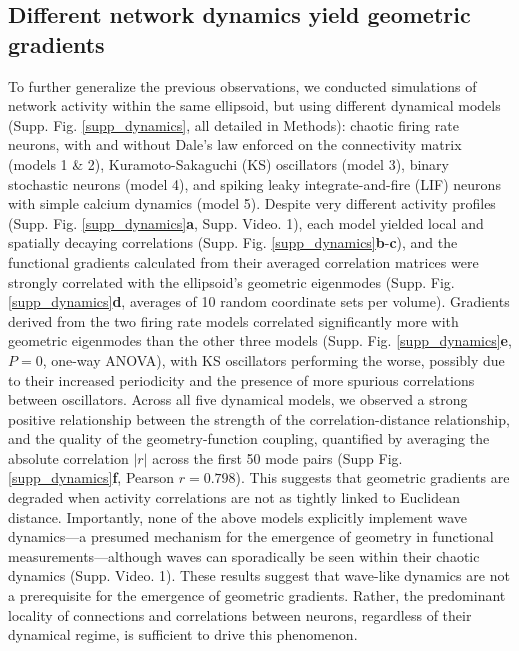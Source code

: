 \documentclass{article}
\begin{document}
\subsection*{Different network dynamics yield geometric gradients}

To further generalize the previous observations, we conducted simulations of network activity within the same ellipsoid, but using different dynamical models (Supp. Fig. \ref{supp_dynamics}, all detailed in Methods): chaotic firing rate neurons\cite{sompolinsky1988chaos, rajan2010stimulus}, with and without Dale's law enforced on the connectivity matrix (models 1 \& 2), Kuramoto-Sakaguchi (KS) oscillators\cite{sakaguchi1986soluble} (model 3), binary stochastic neurons (model 4), and spiking leaky integrate-and-fire (LIF) neurons with simple calcium dynamics\cite{izhikevich2007dynamical} (model 5). Despite very different activity profiles (Supp. Fig. \ref{supp_dynamics}\textbf{a}, Supp. Video. 1), each model yielded local and spatially decaying correlations (Supp. Fig. \ref{supp_dynamics}\textbf{b}-\textbf{c}), and the functional gradients calculated from their averaged correlation matrices were strongly correlated with the ellipsoid's geometric eigenmodes (Supp. Fig. \ref{supp_dynamics}\textbf{d}, averages of 10 random coordinate sets per volume). Gradients derived from the two firing rate models correlated significantly more with geometric eigenmodes than the other three models (Supp. Fig. \ref{supp_dynamics}\textbf{e}, $P=0$, one-way ANOVA), with KS oscillators performing the worse, possibly due to their increased periodicity and the presence of more spurious correlations between oscillators. Across all five dynamical models, we observed a strong positive relationship between the strength of the correlation-distance relationship, and the quality of the geometry-function coupling, quantified by averaging the absolute correlation $|r|$ across the first 50 mode pairs (Supp Fig. \ref{supp_dynamics}\textbf{f}, Pearson $r=0.798$). This suggests that geometric gradients are degraded when activity correlations are not as tightly linked to Euclidean distance. Importantly, none of the above models explicitly implement wave dynamics---a presumed mechanism for the emergence of geometry in functional measurements\cite{pang2023geometric}---although waves can sporadically be seen within their chaotic dynamics (Supp. Video. 1). These results suggest that wave-like dynamics are not a prerequisite for the emergence of geometric gradients. Rather, the predominant locality of connections and correlations between neurons, regardless of their dynamical regime, is sufficient to drive this phenomenon.
\end{document}
